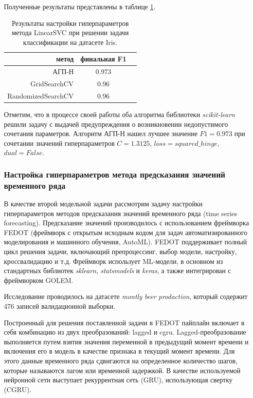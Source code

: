 \documentclass[a4paper,12pt,russian]{article}
\begin{document}
Полученные результаты представлены в таблице \ref{tab22}.

\begin{table}[h!]
\centering
\caption{Результаты настройки гиперпараметров метода LinearSVC при решении задачи классификации на датасете Iris.}\label{tab22}
\begin{tabular}{|r|c|c|}
\hline
метод & финальная F1 \\
\hline
АГП-Н & 0.973 \\
\hline
GridSearchCV & 0.96 \\
\hline
RandomizedSearchCV & 0.96 \\
\hline
\end{tabular}
\end{table}

Отметим, что в процессе своей работы оба алгоритма библиотеки \textit{scikit-learn} решили задачу с выдачей предупреждения о возникновении недопустимого сочетания параметров. Алгоритм АГП-Н нашел лучшее значение $F1 = 0.973$ при сочетании значений гиперпараметров $C=1.3125$, $loss=squared\_hinge$, $dual = False$.


\subsubsection{Настройка гиперпараметров метода предсказания значений временного ряда }

В качестве второй модельной задачи рассмотрим задачу настройки гиперпараметров методов предсказания значений временного ряда (time series forecasting). Предсказание значений производилось с использованием фреймворка FEDOT %
(фреймворк с открытым исходным кодом для задач автоматизированного моделирования и машинного обучения, AutoML). FEDOT поддерживает полный цикл решения задачи, включающий препроцессинг, выбор модели, настройку, кроссвалидацию и т.д. Фреймворк использует ML-модели, в основном из стандартных библиотек \textit{sklearn}, \textit{statsmodels} и \textit{keras}, а также интегрирован с фреймворком GOLEM.

Исследование проводилось на датасете \textit{montly beer prodaction}, который содержит 476 записей валидационной выборки. %

Построенный для решения поставленной задачи в FEDOT пайплайн включает в себя комбинацию из двух преобразований: lagged и cgru. Lagged-преобразование выполняется путем взятия значения переменной в предыдущий момент времени и включения его в модель в качестве признака в текущий момент времени. Для этого данные временного ряда сдвигаются на определенное количество шагов, которые называются лагом или временной задержкой. В качестве используемой нейронной сети выступает рекуррентная сеть (GRU), использующая свертку (CGRU).
\end{document}
